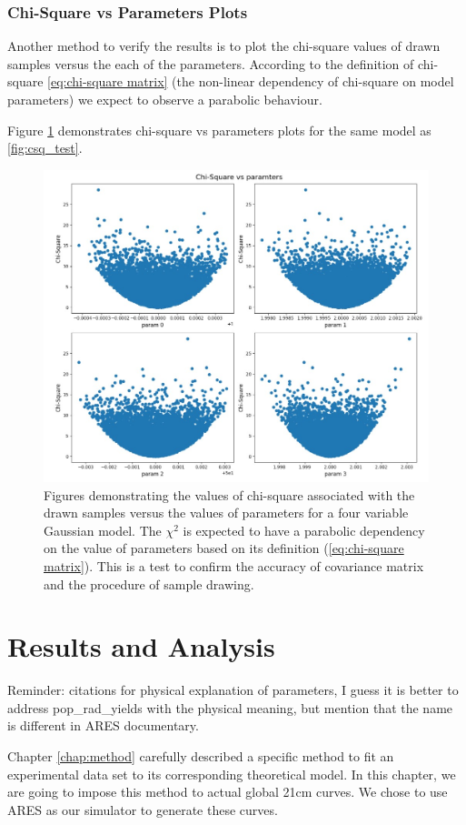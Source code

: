 \documentclass[12pt, TexShade, letterpaper]{report}
\begin{document}
\subsection{Chi-Square vs Parameters Plots}
\label{chap:method,sub:test,subsub:plot}
Another method to verify the results is to plot the chi-square values of drawn samples versus the each of the parameters. According to the definition of chi-square \ref{eq:chi-square matrix} (the non-linear dependency of chi-square on model parameters) we expect to observe a parabolic behaviour.\par
Figure \ref{fig:csq_params} demonstrates chi-square vs parameters plots for the same model as \ref{fig:csq_test}.
\begin{figure}[h!]
\centering
\includegraphics[scale =0.9]{csq_params.jpg}
\caption[Chi-Square vs parameters plots]{Figures demonstrating the values of chi-square associated with the drawn samples versus the values of parameters for a four variable Gaussian model. The $\chi^2$ is expected to have a parabolic dependency on the value of parameters based on its definition (\ref{eq:chi-square matrix}). This is a test to confirm the accuracy of covariance matrix and the procedure of sample drawing.}
\label{fig:csq_params}
\end{figure}
\chapter{Results and Analysis}
\label{chap:results}
Reminder: citations for physical explanation of parameters, I guess it is better to address pop\_rad\_yields with the physical meaning, but mention that the name is different in ARES documentary.\par
Chapter \ref{chap:method} carefully described a specific method to fit an experimental data set to its corresponding theoretical model. In this chapter, we are going to impose this method to actual global 21cm curves. We chose to use ARES as our simulator to generate these curves. \par
\end{document}
